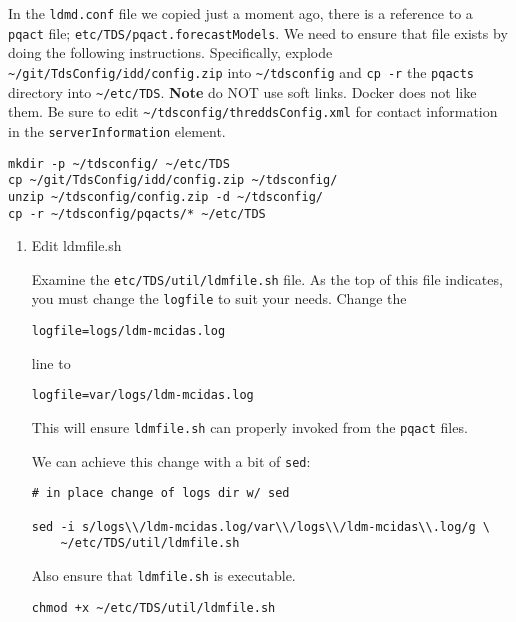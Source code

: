 \documentclass[onecolumn,9pt]{article}
\begin{document}
In the \texttt{ldmd.conf} file we copied just a moment ago, there is a reference to a \texttt{pqact} file; \texttt{etc/TDS/pqact.forecastModels}. We need to ensure that file exists by doing the following instructions. Specifically, explode \texttt{\textasciitilde{}/git/TdsConfig/idd/config.zip} into \texttt{\textasciitilde{}/tdsconfig} and \texttt{cp -r} the \texttt{pqacts} directory into \texttt{\textasciitilde{}/etc/TDS}. \textbf{Note} do NOT use soft links. Docker does not like them. Be sure to edit \texttt{\textasciitilde{}/tdsconfig/threddsConfig.xml} for contact information in the \texttt{serverInformation} element.

\lstset{frame=lines,basicstyle=\footnotesize,numbers=left,numberstyle=\tiny,language=sh,label= ,caption= ,captionpos=b}
\begin{lstlisting}
mkdir -p ~/tdsconfig/ ~/etc/TDS
cp ~/git/TdsConfig/idd/config.zip ~/tdsconfig/
unzip ~/tdsconfig/config.zip -d ~/tdsconfig/
cp -r ~/tdsconfig/pqacts/* ~/etc/TDS
\end{lstlisting}

\begin{enumerate}
\item Edit ldmfile.sh
\label{sec:orgheadline22}

Examine the \texttt{etc/TDS/util/ldmfile.sh} file. As the top of this file indicates, you must change the \texttt{logfile} to suit your needs. Change the 

\begin{verbatim}
logfile=logs/ldm-mcidas.log
\end{verbatim}

line to

\begin{verbatim}
logfile=var/logs/ldm-mcidas.log
\end{verbatim}

This will ensure \texttt{ldmfile.sh} can properly invoked from the \texttt{pqact} files.

We can achieve this change with a bit of \texttt{sed}:

\lstset{frame=lines,basicstyle=\footnotesize,numbers=left,numberstyle=\tiny,language=sh,label= ,caption= ,captionpos=b}
\begin{lstlisting}
# in place change of logs dir w/ sed

sed -i s/logs\\/ldm-mcidas.log/var\\/logs\\/ldm-mcidas\\.log/g \
    ~/etc/TDS/util/ldmfile.sh
\end{lstlisting}

Also ensure that \texttt{ldmfile.sh} is executable.

\lstset{frame=lines,basicstyle=\footnotesize,numbers=left,numberstyle=\tiny,language=sh,label= ,caption= ,captionpos=b}
\begin{lstlisting}
chmod +x ~/etc/TDS/util/ldmfile.sh
\end{lstlisting}
\end{enumerate}
\end{document}
